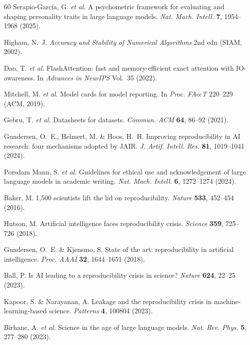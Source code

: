 \documentclass[sn-nature]{sn-jnl}
\begin{document}
\begin{thebibliography}{60}
Serapio-Garc\'{i}a, G. \emph{et al.}
A psychometric framework for evaluating and shaping personality traits in large language models.
\emph{Nat. Mach. Intell.} \textbf{7}, 1954--1968 (2025).

Higham, N.~J.
\emph{Accuracy and Stability of Numerical Algorithms} 2nd edn (SIAM, 2002).

Dao, T. \emph{et al.}
FlashAttention: fast and memory-efficient exact attention with IO-awareness.
In \emph{Advances in NeurIPS} Vol.~35 (2022).

Mitchell, M. \emph{et al.}
Model cards for model reporting.
In \emph{Proc. FAccT} 220--229 (ACM, 2019).

Gebru, T. \emph{et al.}
Datasheets for datasets.
\emph{Commun. ACM} \textbf{64}, 86--92 (2021).

Gundersen, O.~E., Helmert, M. \& Hoos, H.~H.
Improving reproducibility in AI research: four mechanisms adopted by JAIR.
\emph{J. Artif. Intell. Res.} \textbf{81}, 1019--1041 (2024).

Porsdam Mann, S. \emph{et al.}
Guidelines for ethical use and acknowledgement of large language models in academic writing.
\emph{Nat. Mach. Intell.} \textbf{6}, 1272--1274 (2024).

Baker, M.
1,500 scientists lift the lid on reproducibility.
\emph{Nature} \textbf{533}, 452--454 (2016).

Hutson, M.
Artificial intelligence faces reproducibility crisis.
\emph{Science} \textbf{359}, 725--726 (2018).

Gundersen, O.~E. \& Kjensmo, S.
State of the art: reproducibility in artificial intelligence.
\emph{Proc. AAAI} \textbf{32}, 1644--1651 (2018).

Ball, P.
Is AI leading to a reproducibility crisis in science?
\emph{Nature} \textbf{624}, 22--25 (2023).

Kapoor, S. \& Narayanan, A.
Leakage and the reproducibility crisis in machine-learning-based science.
\emph{Patterns} \textbf{4}, 100804 (2023).

Birhane, A. \emph{et al.}
Science in the age of large language models.
\emph{Nat. Rev. Phys.} \textbf{5}, 277--280 (2023).


\end{thebibliography}
\end{document}
